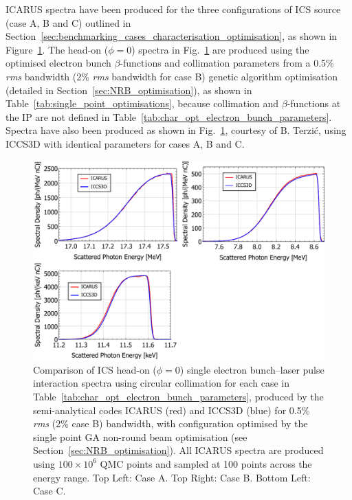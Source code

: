\documentclass[../main.tex]{subfiles}
\begin{document}
\textsc{ICARUS} spectra have been produced for the three configurations of ICS source (case A, B and C) outlined in Section~\ref{sec:benchmarking_cases_characterisation_optimisation}, as shown in Figure~\ref{fig:ICARUS_optimised_benchmarking}. The head-on ($\phi=0$) spectra in Fig.~\ref{fig:ICARUS_optimised_benchmarking} are produced using the optimised electron bunch $\beta$-functions and collimation parameters from a 0.5\% \textit{rms} bandwidth (2\% \textit{rms} bandwidth for case B) genetic algorithm optimisation (detailed in Section~\ref{sec:NRB_optimisation}), as shown in Table~\ref{tab:single_point_optimisations}, because collimation and $\beta$-functions at the IP are not defined in Table~\ref{tab:char_opt_electron_bunch_parameters}. Spectra have also been produced as shown in Fig.~\ref{fig:ICARUS_optimised_benchmarking}, courtesy of B. Terzi\'{c}, using \textsc{ICCS3D} with identical parameters for cases A, B and C.       

\begin{figure}[!h]
\centering
\includegraphics[width=\textwidth]{Figures/Optimisation_and_Characterisation_of_Inverse_Compton_Scattering_Sources/ICARUS_ICCS3D_cases_comparison.pdf}
\caption{Comparison of ICS head-on ($\phi=0$) single electron bunch--laser pulse interaction spectra using circular collimation for each case in Table~\ref{tab:char_opt_electron_bunch_parameters}, produced by the semi-analytical codes \textsc{ICARUS} (red) and \textsc{ICCS3D} (blue) for 0.5\% \textit{rms} (2\% case B) bandwidth, with configuration optimised by the single point GA non-round beam optimisation  (see Section~\ref{sec:NRB_optimisation}). All \textsc{ICARUS} spectra are produced using $100\times 10^{6}$ QMC points and sampled at 100 points across the energy range. Top Left: Case A. Top Right: Case B. Bottom Left: Case C.}
\label{fig:ICARUS_optimised_benchmarking}
\end{figure}
\end{document}
